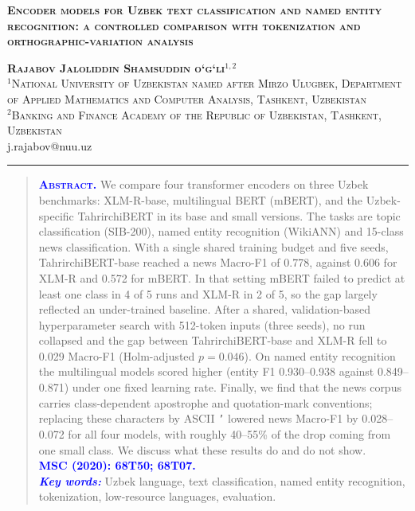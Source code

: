 \documentclass[11pt]{book}
\begin{document}
\sloppy

\renewcommand{\thefootnote}{}
\begin{center}
\textsc{\textbf{Encoder models for Uzbek text classification and named entity recognition: a controlled comparison with tokenization and orthographic-variation analysis}}\\
\medskip

\textsc{\textbf{Rajabov Jaloliddin Shamsuddin o‘g‘li$^{1,2}$}}\\
$^{1}$\textsc{National University of Uzbekistan named after Mirzo Ulugbek, Department of Applied Mathematics and Computer Analysis, Tashkent, Uzbekistan}\\
$^{2}$\textsc{Banking and Finance Academy of the Republic of Uzbekistan, Tashkent, Uzbekistan}\\
{j.rajabov@nuu.uz}\\
\end{center}

\noindent\rule{\linewidth}{1.0 pt}

\begin{quote}
\textsc{\textcolor{blue}{\textbf{Abstract.}}}
We compare four transformer encoders on three Uzbek benchmarks: XLM-R-base, multilingual BERT (mBERT), and the Uzbek-specific TahrirchiBERT in its base and small versions. The tasks are topic classification (SIB-200), named entity recognition (WikiANN) and 15-class news classification. With a single shared training budget and five seeds, TahrirchiBERT-base reached a news Macro-F1 of 0.778, against 0.606 for XLM-R and 0.572 for mBERT. In that setting mBERT failed to predict at least one class in 4 of 5 runs and XLM-R in 2 of 5, so the gap largely reflected an under-trained baseline. After a shared, validation-based hyperparameter search with 512-token inputs (three seeds), no run collapsed and the gap between TahrirchiBERT-base and XLM-R fell to 0.029 Macro-F1 (Holm-adjusted $p=0.046$). On named entity recognition the multilingual models scored higher (entity F1 0.930--0.938 against 0.849--0.871) under one fixed learning rate. Finally, we find that the news corpus carries class-dependent apostrophe and quotation-mark conventions; replacing these characters by ASCII \texttt{'} lowered news Macro-F1 by 0.028--0.072 for all four models, with roughly 40--55\% of the drop coming from one small class. We discuss what these results do and do not show.
\\ [6pt]
\textcolor{blue}{\textbf{MSC (2020): {68T50; 68T07}.}}
\\ [6pt]
\textit{\textcolor{blue}{\textbf{Key words:}}} Uzbek language, text classification, named entity recognition, tokenization, low-resource languages, evaluation.
\end{quote}
\end{document}
